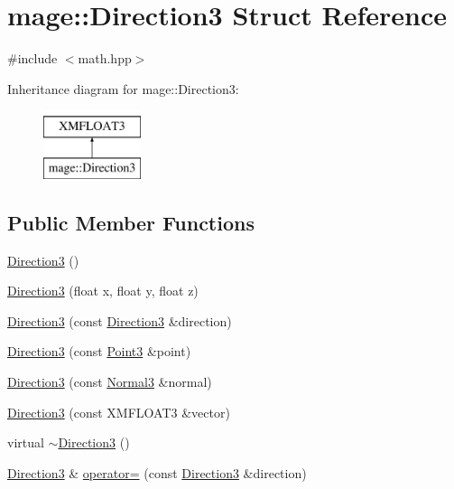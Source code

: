 \hypertarget{structmage_1_1_direction3}{}\section{mage\+:\+:Direction3 Struct Reference}
\label{structmage_1_1_direction3}


{\ttfamily \#include $<$math.\+hpp$>$}

Inheritance diagram for mage\+:\+:Direction3\+:\begin{figure}[H]
\begin{center}
\leavevmode
\includegraphics[height=2.000000cm]{structmage_1_1_direction3}
\end{center}
\end{figure}
\subsection*{Public Member Functions}
\begin{DoxyCompactItemize}
\item 
\hyperlink{structmage_1_1_direction3_a29603b6349c5a313d5bd93e0b0235ff1}{Direction3} ()
\item 
\hyperlink{structmage_1_1_direction3_a1b2cd4ce14856da23dfa9c5facc90da2}{Direction3} (float x, float y, float z)
\item 
\hyperlink{structmage_1_1_direction3_a8f6264f5a7a7590e67f4efa8f0687cdd}{Direction3} (const \hyperlink{structmage_1_1_direction3}{Direction3} \&direction)
\item 
\hyperlink{structmage_1_1_direction3_ad5680af7ed9856d3c5a2454bfec21b3b}{Direction3} (const \hyperlink{structmage_1_1_point3}{Point3} \&point)
\item 
\hyperlink{structmage_1_1_direction3_a18282959c79c93d25488d72f944495e3}{Direction3} (const \hyperlink{structmage_1_1_normal3}{Normal3} \&normal)
\item 
\hyperlink{structmage_1_1_direction3_afb66ddfb4489dd7c0bfc25c29b97df9c}{Direction3} (const X\+M\+F\+L\+O\+A\+T3 \&vector)
\item 
virtual \hyperlink{structmage_1_1_direction3_a4e6e67879902244cbe79be9fd5de369c}{$\sim$\+Direction3} ()
\item 
\hyperlink{structmage_1_1_direction3}{Direction3} \& \hyperlink{structmage_1_1_direction3_a3b3251fcafc37b39bad2c89e5faa09bd}{operator=} (const \hyperlink{structmage_1_1_direction3}{Direction3} \&direction)
\end{DoxyCompactItemize}


